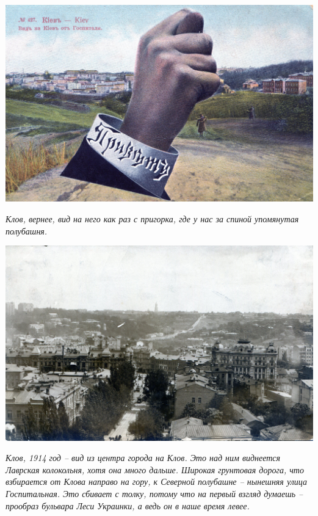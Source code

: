 \newpage

\vspace*{\fill}
\begin{center}
\includegraphics[width=\linewidth]{rpix/klov02.jpg}

\textit{Клов, вернее, вид на него как раз с пригорка, где у нас за спиной упомянутая полубашня.}
\end{center}
\vspace*{\fill}

\newpage
\vspace*{\fill}


\begin{center}
\includegraphics[width=\linewidth]{rpix/klov03.jpg}

\textit{Клов, 1914 год – вид из центра города на Клов. Это над ним виднеется Лаврская колокольня, хотя она много дальше. Широкая грунтовая дорога, что взбирается от Клова направо на гору, к Северной полубашне – нынешняя улица Госпитальная. Это сбивает с толку, потому что на первый взгляд думаешь – прообраз бульвара Леси Украинки, а ведь он в наше время левее.}
\end{center}
\vspace*{\fill}


